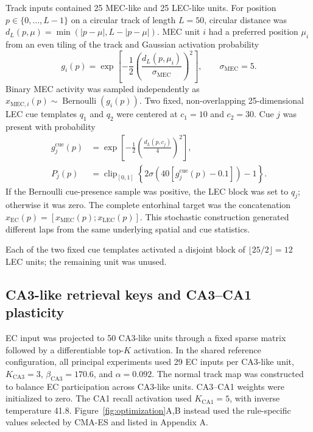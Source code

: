 Track inputs contained 25 MEC-like and 25 LEC-like units. For position
$p\in\{0,\ldots,L-1\}$ on a circular track of length $L=50$, circular distance
was $d_L(p,\mu)=\min(|p-\mu|,L-|p-\mu|)$. MEC unit $i$ had a preferred position
$\mu_i$ from an even tiling of the track and Gaussian activation probability
\begin{equation}
g_i(p)=\exp\!\left[-\frac{1}{2}
 \left(\frac{d_L(p,\mu_i)}{\sigma_{\mathrm{MEC}}}\right)^2\right],
\qquad \sigma_{\mathrm{MEC}}=5.
\end{equation}
Binary MEC activity was sampled independently as
$x_{\mathrm{MEC},i}(p)\sim\operatorname{Bernoulli}(g_i(p))$. Two fixed,
non-overlapping 25-dimensional LEC cue templates $q_1$ and $q_2$ were centered
at $c_1=10$ and $c_2=30$. Cue $j$ was present with probability
\begin{align}
g_j^{\mathrm{cue}}(p)
 &=\exp\!\left[-\frac{1}{2}
 \left(\frac{d_L(p,c_j)}{4}\right)^2\right],\\
P_j(p)&=\operatorname{clip}_{[0,1]}
 \left\{2\sigma\!\left(40[g_j^{\mathrm{cue}}(p)-0.1]\right)-1\right\}.
\end{align}
If the Bernoulli cue-presence sample was positive, the LEC block was set to
$q_j$; otherwise it was zero. The complete entorhinal target was the
concatenation $x_{\mathrm{EC}}(p)=[x_{\mathrm{MEC}}(p);
x_{\mathrm{LEC}}(p)]$. This stochastic construction generated different laps
from the same underlying spatial and cue statistics.

Each of the two fixed cue templates activated a disjoint block of
$\lfloor25/2\rfloor=12$ LEC units; the remaining unit was unused.

\subsection{CA3-like retrieval keys and CA3--CA1 plasticity}

EC input was projected to 50 CA3-like units through a fixed sparse matrix
followed by a differentiable top-$K$ activation. In the shared reference
configuration, all principal experiments used 29 EC inputs per CA3-like unit,
$K_{\mathrm{CA3}}=3$, $\beta_{\mathrm{CA3}}=170.6$, and
$\alpha=0.092$. The normal track map was
constructed to balance EC participation across CA3-like units.
CA3--CA1 weights were initialized to zero. The CA1 recall activation used
$K_{\mathrm{CA1}}=5$, with inverse temperature 41.8. Figure~\ref{fig:optimization}A,B
instead used the rule-specific values selected by CMA-ES and listed in Appendix
A.

